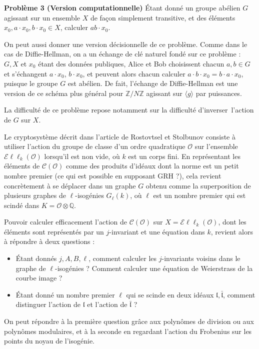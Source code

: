 \documentclass[11pt,a4paper]{article}
\newcommand{\Z}{\mathbb{Z}}
\newcommand{\Q}{\mathbb{Q}}
\renewcommand{\O}{\mathcal{O}}
\newcommand{\Cl}{\mathcal{C}}
\newcommand{\Ell}{\mathcal{E}\ell\ell}
\renewcommand{\frak}{\mathfrak}
\theoremstyle{definition}
\begin{document}
\textbf{Problème 3 (Version computationnelle)} \'Etant donné un groupe abélien $G$ agissant sur un ensemble $X$ de façon simplement transitive, et des éléments $x_0, a\cdot x_0, b\cdot x_0\in X$, calculer $ab\cdot x_0$.

On peut aussi donner une version décisionnelle de ce problème. Comme dans le cas de Diffie-Hellman, on a un échange de clé naturel fondé sur ce problème : $G, X$ et $x_0$ étant des données publiques, Alice et Bob choisissent chacun $a,b\in G$ et s'échangent $a\cdot x_0$, $b\cdot x_0$, et peuvent alors chacun calculer $a\cdot b\cdot x_0=b\cdot a\cdot x_0$, puisque le groupe $G$ est abélien. De fait, l'échange de Diffie-Hellman est une version de ce schéma plus général pour $\Z/N\Z$ agissant sur $\langle g\rangle$ par puissances.

La difficulté de ce problème repose notamment sur la difficulté d'\og inverser\fg\ l'action de $G$ sur $X$.

\vspace{5mm}

Le cryptosystème décrit dans l'article de Rostovtsel et Stolbunov consiste à utiliser l'action du groupe de classe d'un ordre quadratique $\O$ sur l'ensemble $\Ell_k(\O)$ lorsqu'il est non vide, où $k$ est un corps fini. En représentant les éléments de $\Cl(\O)$ comme des produits d'idéaux dont la norme est un petit nombre premier (ce qui est possible en supposant GRH ?), cela revient concrètement à se déplacer dans un graphe $G$ obtenu comme la superposition de plusieurs graphes de $\ell$-isogénies $G_\ell(k)$, où $\ell$ est un nombre premier qui est scindé dans $K=\O\otimes\Q$.

Pouvoir calculer efficacement l'action de $\Cl(\O)$ sur $X=\Ell_k(\O)$, dont les éléments sont représentés par un $j$-invariant et une équation dans $k$, revient alors à répondre à deux questions :
\begin{itemize}
\item \'Etant donnés $j,A,B,\ell$, comment calculer les $j$-invariants voisins dans le graphe de $\ell$-isogénies ? Comment calculer une équation de Weierstrass de la courbe image ?
\item \'Etant donné un nombre premier $\ell$ qui se scinde en deux idéaux $\frak l,\bar{\frak l}$, comment distinguer l'action de $\frak l$ et l'action de $\bar{\frak l}$ ?
\end{itemize}

On peut répondre à la première question grâce aux polynômes de division ou aux polynômes modulaires, et à la seconde en regardant l'action du Frobenius sur les points du noyau de l'isogénie.
\end{document}
